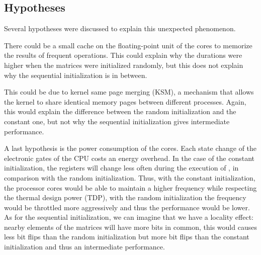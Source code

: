         \subsection{Hypotheses}
            Several hypotheses were discussed to explain this unexpected phenomenon.

            There could be a small cache  on the floating-point unit of the cores to memorize the results of frequent
            operations. This could explain why the durations were higher when the matrices were initialized randomly,
            but this does not explain why the sequential initialization is in between.

            This could be due to kernel same page merging (KSM), a mechanism that allows the kernel to share identical
            memory pages between different processes. Again, this would explain the difference between the random
            initialization and the constant one, but not why the sequential initialization gives intermediate
            performance.

            A last hypothesis is the power consumption of the cores. Each state change of the electronic gates of the
            CPU costs an energy overhead. In the case of the constant initialization, the registers will change less
            often during the execution of \dgemm, in comparison with the random initialization. Thus, with the
            constant initialization, the processor cores would be able to maintain a higher frequency while respecting
            the thermal design power (TDP), with the random initialization the frequency would be throttled more
            aggressively and thus the performance would be lower.
            As for the sequential initialization, we can imagine that we have a locality effect: nearby elements of the
            matrices will have more bits in common, this would causes less bit flips than the random initialization but
            more bit flips than the constant initialization and thus an intermediate performance.

